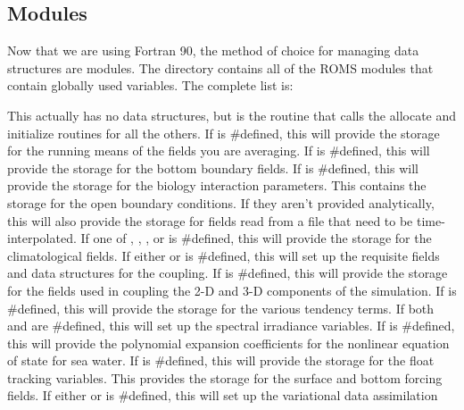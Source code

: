 \subsection{Modules}
Now that we are using Fortran 90, the method of choice for managing
data structures are modules. The  directory
contains all of the ROMS modules that contain globally used
variables. The complete list is:
\begin{klist}
   This actually has no data structures, but is the
    routine that calls the allocate and initialize routines for all the
    others.
   If  is #defined, this will
    provide the storage for the running means of the fields you are averaging.
    If  is #defined, this will
    provide the storage for the bottom boundary fields.
    If  is #defined, this will
    provide the storage for the biology interaction parameters.
   This contains the storage for the open boundary
    conditions. If they aren't provided analytically, this will also provide
    the storage for fields read from a file that need to be time-interpolated.
    If one of , ,
    , or  is #defined, this will
    provide the storage for the climatological fields.
    If either   or
     is #defined, this will set up the requisite fields and
    data structures for the coupling.
    If  is #defined, this will
    provide the storage for the fields used in coupling the 2-D
    and 3-D components of the simulation.
    If  is #defined, this will
    provide the storage for the various tendency terms.
    If both  and 
    are #defined, this will set up the spectral irradiance
    variables.
    If  is #defined, this will
    provide the polynomial expansion coefficients for the nonlinear equation
    of state for sea water.
   If  is #defined, this will
    provide the storage for the float tracking variables.
   This
    provides the storage for the surface and bottom forcing fields.
   If either  or 
    is #defined, this will set up the variational data assimilation

\end{klist}
